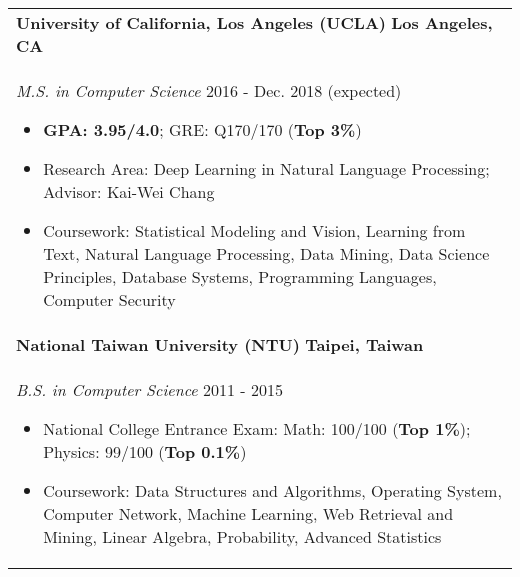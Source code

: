 \documentclass[letterpaper,11pt]{article} %
\begin{document}
{%
\begin{tabular}{p{18.5cm}}
{\bf{University of California, Los Angeles (UCLA)}}  \hfill \bf{Los Angeles, CA}\\
{\it M.S. in Computer Science} \hfill  2016 - Dec. 2018 (expected)
\begin{itemize}
\item \textbf{GPA: 3.95/4.0}; GRE: Q170/170 (\textbf{Top 3\%})
\item Research Area: Deep Learning in Natural Language Processing; Advisor: Kai-Wei Chang 
\item Coursework: Statistical Modeling and Vision, Learning from Text, Natural Language Processing, Data Mining, Data Science Principles, Database Systems, Programming Languages, Computer Security \vspace*{-\baselineskip}%
\end{itemize}\\ 
\vspace{.1mm}
%
{\bf{National Taiwan University (NTU)}} \hfill \bf{Taipei, Taiwan}\\
{\it B.S. in Computer Science} \hfill 2011 - 2015
\begin{itemize}
\item National College Entrance Exam:  Math: 100/100 (\textbf{Top 1\%}); Physics: 99/100 (\textbf{Top 0.1\%})
\item Coursework: Data Structures and Algorithms, Operating System, Computer Network, Machine Learning, Web Retrieval and Mining, Linear Algebra, Probability, Advanced Statistics \vspace*{-\baselineskip} 
\end{itemize} 
\end{tabular}

}
\end{document}
